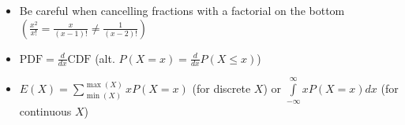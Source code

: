\documentclass[../main.tex]{subfile}
\begin{document}

\begin{itemize}
	\item Be careful when cancelling fractions with a factorial on the bottom $\displaystyle \left(\frac{x^2}{x!} = \frac{x}{(x - 1)!} \ne \frac{1}{(x - 2)!}\right)$
\end{itemize}


\begin{itemize}
	\item $\text{PDF} = \frac{d}{dx} \text{CDF}$ (alt. $P(X = x) = \frac{d}{dx} P(X \le x)$)
	\item $E(X) = \sum\limits_{\min(X)}^{\max(X)} x P(X = x)$ (for discrete $X$) or $\int\limits_{-\infty}^{\infty} x P(X = x) dx$ (for continuous $X$)
\end{itemize}
\end{document}
